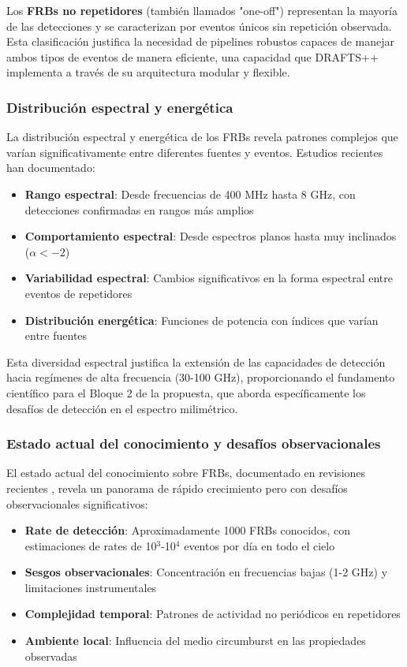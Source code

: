 Los \textbf{FRBs no repetidores} (también llamados "one-off") representan la mayoría de las detecciones y se caracterizan por eventos únicos sin repetición observada. Esta clasificación justifica la necesidad de pipelines robustos capaces de manejar ambos tipos de eventos de manera eficiente, una capacidad que DRAFTS++ implementa a través de su arquitectura modular y flexible.

\subsubsection{Distribución espectral y energética}

La distribución espectral y energética de los FRBs revela patrones complejos que varían significativamente entre diferentes fuentes y eventos. Estudios recientes han documentado:

\begin{itemize}
    \item \textbf{Rango espectral}: Desde frecuencias de 400 MHz hasta 8 GHz, con detecciones confirmadas en rangos más amplios
    \item \textbf{Comportamiento espectral}: Desde espectros planos hasta muy inclinados ($\alpha < -2$)
    \item \textbf{Variabilidad espectral}: Cambios significativos en la forma espectral entre eventos de repetidores
    \item \textbf{Distribución energética}: Funciones de potencia con índices que varían entre fuentes
\end{itemize}

Esta diversidad espectral justifica la extensión de las capacidades de detección hacia regímenes de alta frecuencia (30-100 GHz), proporcionando el fundamento científico para el Bloque 2 de la propuesta, que aborda específicamente los desafíos de detección en el espectro milimétrico.

\subsubsection{Estado actual del conocimiento y desafíos observacionales}

El estado actual del conocimiento sobre FRBs, documentado en revisiones recientes \cite{Petroff_2022}, revela un panorama de rápido crecimiento pero con desafíos observacionales significativos:

\begin{itemize}
    \item \textbf{Rate de detección}: Aproximadamente 1000 FRBs conocidos, con estimaciones de rates de 10$^3$-10$^4$ eventos por día en todo el cielo
    \item \textbf{Sesgos observacionales}: Concentración en frecuencias bajas (1-2 GHz) y limitaciones instrumentales
    \item \textbf{Complejidad temporal}: Patrones de actividad no periódicos en repetidores
    \item \textbf{Ambiente local}: Influencia del medio circumburst en las propiedades observadas
\end{itemize}

